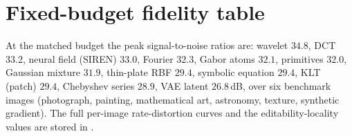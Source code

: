 \documentclass[journal]{IEEEtran}
\begin{document}
\appendices
\section{Fixed-budget fidelity table}
At the matched budget the peak signal-to-noise ratios are: wavelet $34.8$, DCT $33.2$, neural field
(SIREN) $33.0$, Fourier $32.3$, Gabor atoms $32.1$, primitives $32.0$, Gaussian mixture $31.9$,
thin-plate RBF $29.4$, symbolic equation $29.4$, KLT (patch) $29.4$, Chebyshev series $28.9$, VAE
latent $26.8$\,dB, over six benchmark images (photograph, painting, mathematical art, astronomy,
texture, synthetic gradient). The full per-image rate-distortion curves and the editability-locality
values are stored in .

\end{document}
